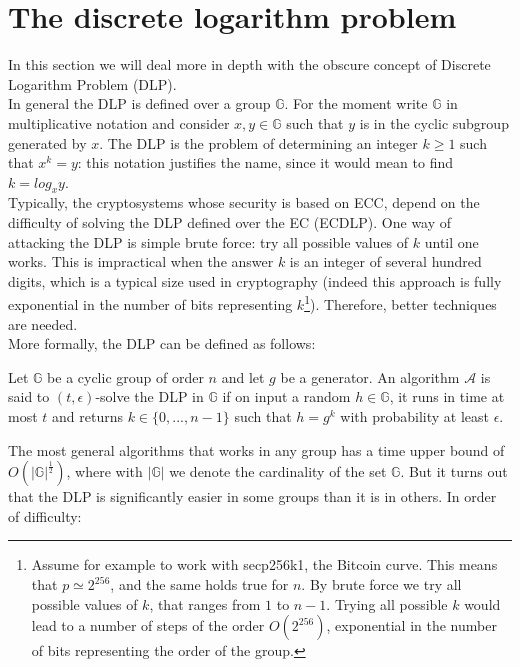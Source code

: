 \bigskip

\bigskip

\section{The discrete logarithm problem}
\label{dlp}
In this section we will deal more in depth with the obscure concept of Discrete Logarithm Problem (DLP).
\\
In general the DLP is defined over a group $\mathbb{G}$. For the moment write $\mathbb{G}$ in multiplicative notation and consider $x, y \in \mathbb{G}$ such that $y$ is in the cyclic subgroup generated by $x$. The DLP is the problem of determining an integer $k \geq 1$ such that $x^k = y$: this notation justifies the name, since it would mean to find $k = log_xy$.
\\
Typically, the cryptosystems whose security is based on ECC, depend on the difficulty of solving the DLP defined over the EC (ECDLP). One way of attacking the DLP is simple brute force: try all possible values of $k$ until one works. This is impractical when the answer $k$ is an integer of several hundred digits, which is a typical size used in cryptography (indeed this approach is fully exponential in the number of bits representing $k$\footnote{Assume for example to work with secp256k1, the Bitcoin curve. This means that $p \simeq 2^{256}$, and the same holds true for $n$. By brute force we try all possible values of $k$, that ranges from $1$ to $n-1$. Trying all possible $k$ would lead to a number of steps of the order $O(2^{256})$, exponential in the number of bits representing the order of the group.}). Therefore, better techniques are needed.
\\
More formally, the DLP can be defined as follows:
\begin{mydef}
	Let $\mathbb{G}$ be a cyclic group of order $n$ and let $g$ be a generator. An algorithm $\mathcal{A}$ is said to $(t, \epsilon)$-solve the DLP in $\mathbb{G}$ if on input a random $h \in \mathbb{G}$, it runs in time at most $t$ and returns $k \in \{0, ..., n - 1\}$ such that $h = g^k$ with probability at least $\epsilon$.
\end{mydef}
\noindent
The most general algorithms that works in any group has a time upper bound of $O(|\mathbb{G}|^{\frac{1}{2}})$, where with $|\mathbb{G}|$ we denote the cardinality of the set $\mathbb{G}$. But it turns out that the DLP is significantly easier in some groups than it is in others. In order of difficulty:
